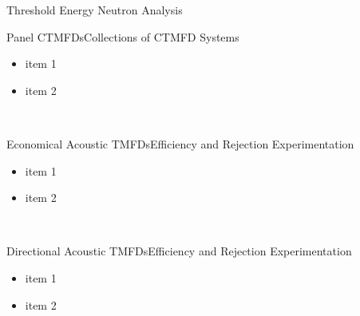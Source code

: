 \begin{cell}{6}{12}{Threshold Energy Neutron Analysis}{}
  \hspace*{\fill}
  \begin{cell}{2}{3}{Panel CTMFDs}{Collections of CTMFD Systems}
    \begin{itemize}
      \item item 1
      \item item 2
    \end{itemize}
  \end{cell}%
  \hspace*{\fill}
  \begin{cell}{2}{3}{}{}
  \end{cell} \\
  \vspace*{\fill}
  \begin{cell}{3}{3}{Economical Acoustic TMFDs}{Efficiency and Rejection Experimentation}
    \begin{itemize}
      \item item 1
      \item item 2
    \end{itemize}
  \end{cell}%
  \hspace*{\fill}
  \begin{cell}{3}{3}{}{}
  \end{cell} \\
  \vspace*{\fill}
  \begin{cell}{3}{3}{}{}
  \end{cell}
  \hspace*{\fill}
  \begin{cell}{3}{3}{Directional Acoustic TMFDs}{Efficiency and Rejection Experimentation}
    \begin{itemize}
      \item item 1
      \item item 2
    \end{itemize}
  \end{cell}%
\end{cell}%
\hspace*{.5in}
